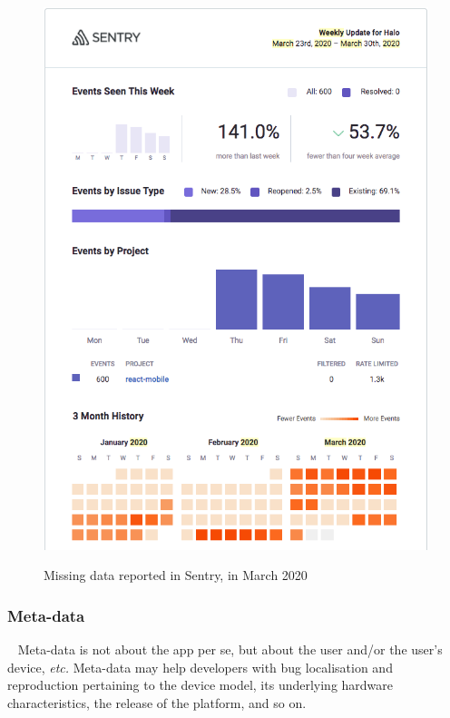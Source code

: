 \begin{figure}[htbp!]
\begin{minipage}{.45\textwidth}
  \includegraphics[width=\textwidth]{images/localhalo/sentry-weekly-report-23-mar-2020.png}
  \label{fig:localhalo-sentry-weekly-report-23-mar-2020}
\end{minipage}
    \caption{Missing data reported in Sentry, in March 2020}
    \label{fig:sentry-missing-data-march-2020}
\end{figure}


\subsubsection{Meta-data}~\label{section-meta-data}
Meta-data is not about the app per se, but about the user and/or the user's device, \textit{etc.} 
Meta-data may help developers with bug localisation and reproduction pertaining to the device model, its underlying hardware characteristics, the release of the platform, and so on. 

